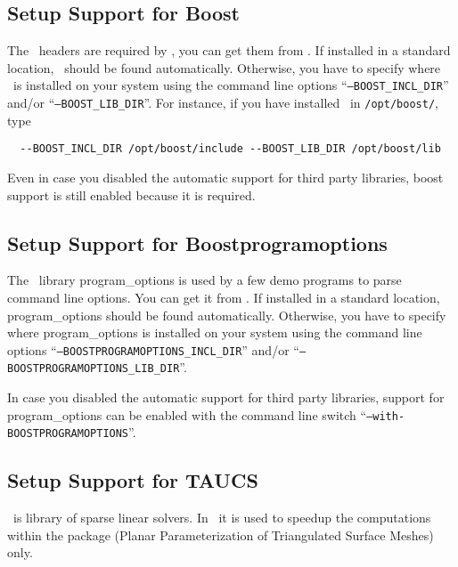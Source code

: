 \subsection{Setup Support for Boost\label{sec:boost-setup}}

The \boost\ headers are required by \cgal, you can get them from
\boostpage. If installed in a standard location, \boost\ should be
found automatically. Otherwise, you have to specify where \boost\ is
installed on your system using the command line options
``\texttt{--BOOST\_INCL\_DIR}'' and/or ``\texttt{--BOOST\_LIB\_DIR}''.
For instance, if you have installed \boost\ in \texttt{/opt/boost/},
type
\begin{verbatim}
  --BOOST_INCL_DIR /opt/boost/include --BOOST_LIB_DIR /opt/boost/lib
\end{verbatim}

Even in case you disabled the automatic support for third party
libraries, boost support is still enabled because it is required.

\subsection{Setup Support for Boostprogramoptions\label{sec:boostlibs-setup}}

The \boost\ library program\_options is used by a few demo programs to
parse command line options. You can get it from \boostpage. If
installed in a standard location, program\_options should be found
automatically. Otherwise, you have to specify where program\_options
is installed on your system using the command line options
``\texttt{--BOOSTPROGRAMOPTIONS\_INCL\_DIR}'' and/or
``\texttt{--BOOSTPROGRAMOPTIONS\_LIB\_DIR}''.

In case you disabled the automatic support for third party libraries,
support for program\_options can be enabled with the command line
switch ``\texttt{--with-BOOSTPROGRAMOPTIONS}''.


\subsection{Setup Support for TAUCS\label{sec:taucs-setup}}

\taucs\ is library of sparse linear solvers.
In \cgal\ it is used to speedup the computations within
the  package (Planar Parameterization
of Triangulated Surface Meshes) only.

